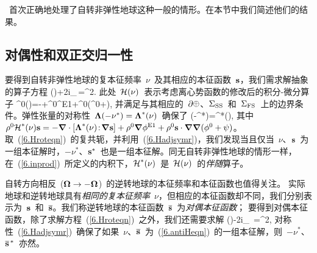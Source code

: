 \textcite{lognonne91}~首次正确地处理了自转非弹性地球这种一般的情形。在本节中我们简述他们的结果。

\renewcommand{\thesubsection}{$\!\!\!\raise1.3ex\hbox{$\star$}\!\!$
\arabic{chapter}.\arabic{section}.\arabic{subsection}}
\subsection{对偶性和双正交归一性}
%
%
\label{6.sec.duality2}
\renewcommand{\thesubsection}{\arabic{chapter}.\arabic{section}.\arabic{subsection}}

要得到自转非弹性地球的复本征频率~$\nu$~及其相应的本征函数~$\mbox{${\bf s}$}$，我们需求解抽象的算子方程
\eq
\label{6.Hroteqn}
\sH(\nu)\bs+2i\nu_{\,}\bOmega\times\bs=\nu^2\bs.
\en
此处~$\mbox{$\cal H$}(\nu)$~表示考虑离心势函数的修改后的积分-微分算子
%
%
\eq
\label{6.Hrotdef}
\rho^0\sH(\nu)\bs=-\bdel\cdot[\bLambda(\nu)\!:\!\bdel\bs]
+\rho^0\bdel\phi^{\rm E1}+\rho^0\bs\cdot\bdel\bdel(\phi^0+\psi),
\en
并满足与其相应的~$\p\earth$、$\Sigma_{\rm SS}$~和~$\Sigma_{\rm FS}$~上的边界条件。弹性张量的对称性~$\mbox{\boldmath $\bf \Lambda$}(-\nu^*)=\mbox{\boldmath $\bf \Lambda$}^*(\nu)$~确保了
\eq
\label{6.Hadjsymr}
\sH(-\nu^*)=\sH^*(\nu),
\en
其中~$\rho^0\mbox{$\cal H$}^*(\nu)\mbox{${\bf s}$}=-\mbox{\boldmath $\nabla$}\cdot[\mbox{\boldmath $\bf \Lambda$}^*(\nu)\!:\!\mbox{\boldmath $\nabla$}\mbox{${\bf s}$}]
+\rho^0\mbox{\boldmath $\nabla$}\phi^{\rm E1}+\rho^0\mbox{${\bf s}$}\cdot\mbox{\boldmath $\nabla$}\mbox{\boldmath $\nabla$}(\phi^0+\psi)$。取~(\ref{6.Hroteqn})~的复共轭，并利用~(\ref{6.Hadjsymr})，我们发现当且仅当~$\nu$、$\mbox{${\bf s}$}$~为一组本征解时，$-\nu^*$、$\mbox{${\bf s}$}^*$~也是一组本征解。同无自转非弹性地球的情形一样，在~(\ref{6.inprod})~所定义的内积下，$\mbox{$\cal H$}^*(\nu)$~是~$\mbox{$\cal H$}(\nu)$~的{\em 伴随\/}算子。
%
%

自转方向相反~($\mbox{\boldmath $\bf \Omega$}\rightarrow -\mbox{\boldmath $\bf \Omega$}$)~的逆转地球的本征频率和本征函数也值得关注。
%
实际地球和逆转地球具有{\em 相同的复本征频率\/}~$\nu$，但相应的本征函数却不同，我们分别表示为~$\mbox{${\bf s}$}$~和~$\overline{\mbox{${\bf s}$}}$。我们称逆转地球的本征函数~$\overline{\mbox{${\bf s}$}}$~为{\em 对偶本征函数\/}；
%
%
要得到对偶本征函数，除了求解方程~(\ref{6.Hroteqn})~之外，我们还需要求解
\eq
\label{6.antiHeqn}
\sH(\nu)\overline{\bs}-2i\nu_{\,}
\bOmega\times\overline{\bs}=\nu^2\overline{\bs},
\en
对称性~(\ref{6.Hadjsymr})~确保了如果~$\nu$、$\overline{\mbox{${\bf s}$}}$~为~(\ref{6.antiHeqn})~的一组本征解，则~$-\nu^*$、$\overline{\bs}^{\,\raisebox{-.5ex}{\scriptsize{*}}}$~亦然。

